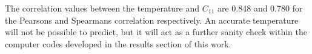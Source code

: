 The correlation values between the temperature and $C_{11}$ are 0.848 and 0.780 for the Pearsons and Spearmans correlation respectively.  An accurate temperature will not be possible to predict, but it will act as a further sanity check within the computer codes developed in the results section of this work.






